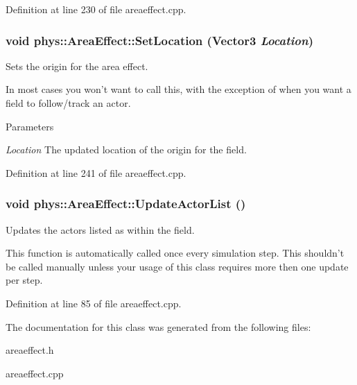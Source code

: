 Definition at line 230 of file areaeffect.cpp.

\hypertarget{classphys_1_1AreaEffect_aeae24cc1087ad174d406a7a5117d0aed}{
\subsubsection[{SetLocation}]{\setlength{\rightskip}{0pt plus 5cm}void phys::AreaEffect::SetLocation ({\bf Vector3} {\em Location})}}
\label{d4/d55/classphys_1_1AreaEffect_aeae24cc1087ad174d406a7a5117d0aed}


Sets the origin for the area effect. 

In most cases you won't want to call this, with the exception of when you want a field to follow/track an actor. 
\begin{DoxyParams}{Parameters}
\item[{\em Location}]The updated location of the origin for the field. \end{DoxyParams}


Definition at line 241 of file areaeffect.cpp.

\hypertarget{classphys_1_1AreaEffect_a0a0e6dfc6353d19b19e7bea037172072}{
\subsubsection[{UpdateActorList}]{\setlength{\rightskip}{0pt plus 5cm}void phys::AreaEffect::UpdateActorList ()}}
\label{d4/d55/classphys_1_1AreaEffect_a0a0e6dfc6353d19b19e7bea037172072}


Updates the actors listed as within the field. 

This function is automatically called once every simulation step. This shouldn't be called manually unless your usage of this class requires more then one update per step. 

Definition at line 85 of file areaeffect.cpp.



The documentation for this class was generated from the following files:\begin{DoxyCompactItemize}
\item 
areaeffect.h\item 
areaeffect.cpp\end{DoxyCompactItemize}
